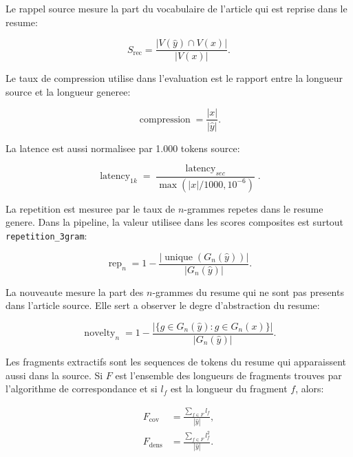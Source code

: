 Le rappel source mesure la part du vocabulaire de l'article qui est reprise dans le resume:

\begin{equation}
S_{\mathrm{rec}} =
\frac{|V(\hat{y}) \cap V(x)|}{|V(x)|}.
\label{eq:source-recall}
\end{equation}

Le taux de compression utilise dans l'evaluation est le rapport entre la longueur source et la longueur generee:

\begin{equation}
\operatorname{compression} = \frac{|x|}{|\hat{y}|}.
\label{eq:compression-ratio}
\end{equation}

La latence est aussi normalisee par 1.000 tokens source:

\begin{equation}
\operatorname{latency}_{1k} =
\frac{\operatorname{latency}_{sec}}{\max(|x|/1000, 10^{-6})}.
\label{eq:latency-1k}
\end{equation}

La repetition est mesuree par le taux de $n$-grammes repetes dans le resume genere. Dans la pipeline, la valeur utilisee dans les scores composites est surtout \texttt{repetition\_3gram}:

\begin{equation}
\operatorname{rep}_{n} =
1 - \frac{|\operatorname{unique}(G_n(\hat{y}))|}{|G_n(\hat{y})|}.
\label{eq:repetition-ngram}
\end{equation}

La nouveaute mesure la part des $n$-grammes du resume qui ne sont pas presents dans l'article source. Elle sert a observer le degre d'abstraction du resume:

\begin{equation}
\operatorname{novelty}_{n} =
1 - \frac{|\{g \in G_n(\hat{y}) : g \in G_n(x)\}|}{|G_n(\hat{y})|}.
\label{eq:novelty-ngram}
\end{equation}

Les fragments extractifs sont les sequences de tokens du resume qui apparaissent aussi dans la source. Si $F$ est l'ensemble des longueurs de fragments trouves par l'algorithme de correspondance et si $l_f$ est la longueur du fragment $f$, alors:

\begin{align}
F_{\mathrm{cov}} &= \frac{\sum_{f \in F} l_f}{|\hat{y}|}, \\
F_{\mathrm{dens}} &= \frac{\sum_{f \in F} l_f^2}{|\hat{y}|}.
\label{eq:fragment-coverage-density}
\end{align}

